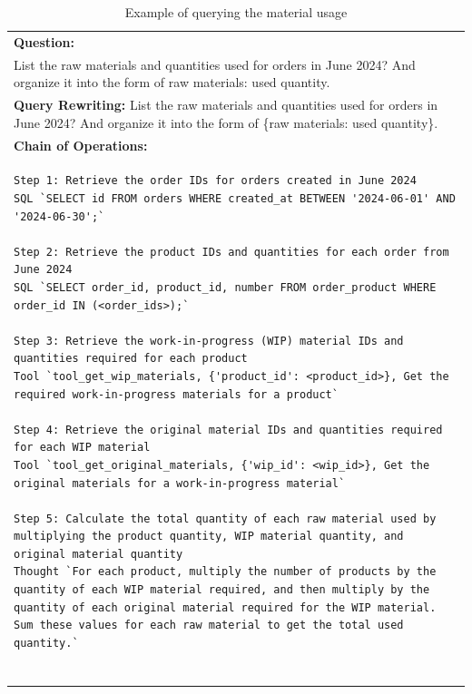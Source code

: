 \documentclass[preprint,12pt]{elsarticle}
\providecommand{\DIFdelend}{} %
\DeclareRobustCommand{\DIFdelend}{\DIFOaddend \let\includegraphics\DIFOincludegraphics} %
\begin{document}
\DIFdelend \begin{center}
\begin{longtable}{p{390pt}}
\caption{Example of querying the material usage}
    \label{tab:case_query_material}\\
    \toprule
      \textbf{Question:}     \\
       List the raw materials and quantities used for orders in June 2024? And organize it into the form of {raw materials: used quantity}.\\
          \hline
          \textbf{Query Rewriting: }
          List the raw materials and quantities used for orders in June 2024? And organize it into the form of \{raw materials: used quantity\}.\\
 \hline
\textbf{Chain of Operations:}\\

\begin{lstlisting}[style=my_operation, label={lst:chain_of_operation}]
Step 1: Retrieve the order IDs for orders created in June 2024
SQL `SELECT id FROM orders WHERE created_at BETWEEN '2024-06-01' AND '2024-06-30';`

Step 2: Retrieve the product IDs and quantities for each order from June 2024
SQL `SELECT order_id, product_id, number FROM order_product WHERE order_id IN (<order_ids>);`

Step 3: Retrieve the work-in-progress (WIP) material IDs and quantities required for each product
Tool `tool_get_wip_materials, {'product_id': <product_id>}, Get the required work-in-progress materials for a product`

Step 4: Retrieve the original material IDs and quantities required for each WIP material
Tool `tool_get_original_materials, {'wip_id': <wip_id>}, Get the original materials for a work-in-progress material`

Step 5: Calculate the total quantity of each raw material used by multiplying the product quantity, WIP material quantity, and original material quantity
Thought `For each product, multiply the number of products by the quantity of each WIP material required, and then multiply by the quantity of each original material required for the WIP material. Sum these values for each raw material to get the total used quantity.`


\end{lstlisting}
\end{longtable}
\end{center}
\end{document}
